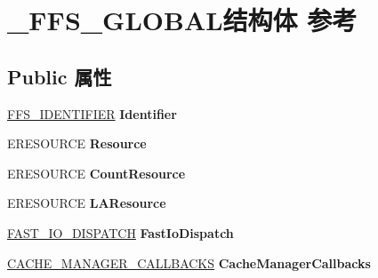 \hypertarget{struct___f_f_s___g_l_o_b_a_l}{}\section{\+\_\+\+F\+F\+S\+\_\+\+G\+L\+O\+B\+A\+L结构体 参考}
\label{struct___f_f_s___g_l_o_b_a_l}
\subsection*{Public 属性}
\begin{DoxyCompactItemize}
\item 
\mbox{\label{struct___f_f_s___g_l_o_b_a_l_a2403eb9ef289251a45058b5dd1c99695}} 
\hyperlink{struct___f_f_s___i_d_e_n_t_i_f_i_e_r}{F\+F\+S\+\_\+\+I\+D\+E\+N\+T\+I\+F\+I\+ER} {\bfseries Identifier}
\item 
\mbox{\label{struct___f_f_s___g_l_o_b_a_l_ac035e9b781c11504485dee1db86e3883}} 
E\+R\+E\+S\+O\+U\+R\+CE {\bfseries Resource}
\item 
\mbox{\label{struct___f_f_s___g_l_o_b_a_l_ab780c540a0137f4ce631683a661cccfe}} 
E\+R\+E\+S\+O\+U\+R\+CE {\bfseries Count\+Resource}
\item 
\mbox{\label{struct___f_f_s___g_l_o_b_a_l_ad5ea69dc7a267d61ee2126302274a0eb}} 
E\+R\+E\+S\+O\+U\+R\+CE {\bfseries L\+A\+Resource}
\item 
\mbox{\label{struct___f_f_s___g_l_o_b_a_l_a94e13d2b49a5fb677f0db9eeb39cdc31}} 
\hyperlink{struct___f_a_s_t___i_o___d_i_s_p_a_t_c_h}{F\+A\+S\+T\+\_\+\+I\+O\+\_\+\+D\+I\+S\+P\+A\+T\+CH} {\bfseries Fast\+Io\+Dispatch}
\item 
\mbox{\label{struct___f_f_s___g_l_o_b_a_l_a6fd1091822e3e6442d96c24589b6a65b}} 
\hyperlink{struct___c_a_c_h_e___m_a_n_a_g_e_r___c_a_l_l_b_a_c_k_s}{C\+A\+C\+H\+E\+\_\+\+M\+A\+N\+A\+G\+E\+R\+\_\+\+C\+A\+L\+L\+B\+A\+C\+KS} {\bfseries Cache\+Manager\+Callbacks}
\item 
\mbox{\label{struct___f_f_s___g_l_o_b_a_l_a4d052a989e7465f772e98c78d8406e4b}} 

\end{DoxyCompactItemize}
